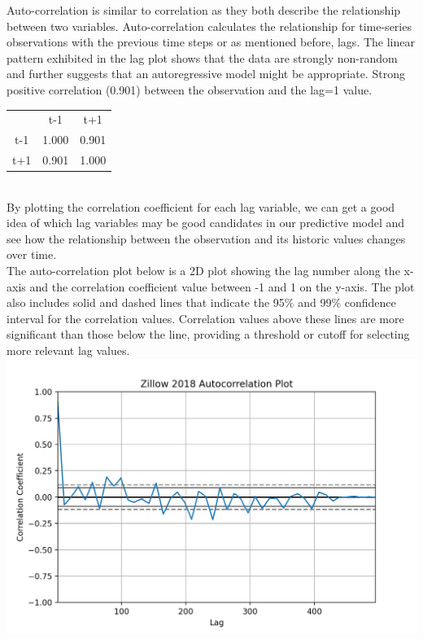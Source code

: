 \documentclass{article}
\begin{document}
	Auto-correlation is similar to correlation as they both describe the relationship between two variables. Auto-correlation calculates the relationship for time-series observations with the previous time steps or as mentioned before, lags. The linear pattern exhibited in the lag plot shows that the data are strongly non-random and further suggests that an autoregressive model might be appropriate. Strong positive correlation (0.901) between the observation and the lag=1 value. \\
	
	\begin{center}
    \begin{tabular}{ c c c }
     \smallskip & t-1 & t+1 \\ 
     t-1 & 1.000 & 0.901 \\  
     t+1 & 0.901 & 1.000    
    \end{tabular}
    \end{center} \\
	
	By plotting the correlation coefficient for each lag variable, we can get a good idea of which lag variables may be good candidates in our predictive model and see how the relationship between the observation and its historic values changes over time. \\
	
	The auto-correlation plot below is a 2D plot showing the lag number along the x-axis and the correlation coefficient value between -1 and 1 on the y-axis. The plot also includes solid and dashed lines that indicate the 95\% and 99\% confidence interval for the correlation values. Correlation values above these lines are more significant than those below the line, providing a threshold or cutoff for selecting more relevant lag values. \\
	
	\includegraphics[scale = 0.2]{../plots/2018/zillow2018_autocorrelation1.png} \\
	
\end{document}
